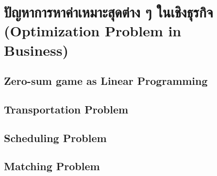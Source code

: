 \chapter{ปัญหาการหาค่าเหมาะสุดต่าง ๆ ในเชิงธุรกิจ (Optimization Problem in Business)}
\section{Zero-sum game as Linear Programming}
\section{Transportation Problem}
\section{Scheduling Problem}
\section{Matching Problem}

